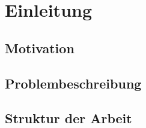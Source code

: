 \section{Einleitung}

\subsection{Motivation}

\blindtext

\subsection{Problembeschreibung}

\blindtext

\subsection{Struktur der Arbeit}

\blindtext
